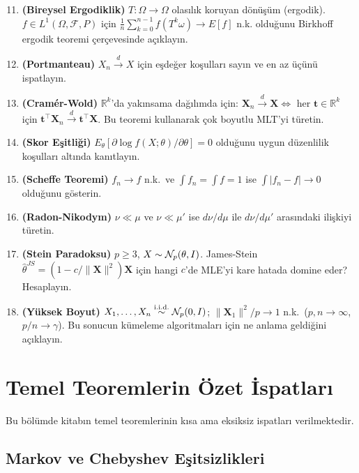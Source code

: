 \begin{enumerate}[label=\textbf{G.\arabic*.}]
\setcounter{enumi}{10}
  \item \textbf{(Bireysel Ergodiklik)} $T:\Omega\to\Omega$ olasılık koruyan dönüşüm (ergodik). $f\in L^1(\Omega,\mathcal{F},P)$ için $\frac{1}{n}\sum_{k=0}^{n-1}f(T^k\omega)\to E[f]$ n.k. olduğunu Birkhoff ergodik teoremi çerçevesinde açıklayın.
  \item \textbf{(Portmanteau)} $X_n\xrightarrow{d}X$ için eşdeğer koşulları sayın ve en az üçünü ispatlayın.
  \item \textbf{(Cramér-Wold)} $\mathbb{R}^k$'da yakınsama dağılımda için: $\mathbf{X}_n\xrightarrow{d}\mathbf{X}\iff$ her $\mathbf{t}\in\mathbb{R}^k$ için $\mathbf{t}^\top\mathbf{X}_n\xrightarrow{d}\mathbf{t}^\top\mathbf{X}$. Bu teoremi kullanarak çok boyutlu MLT'yi türetin.
  \item \textbf{(Skor Eşitliği)} $E_\theta[\partial\log f(X;\theta)/\partial\theta]=0$ olduğunu uygun düzenlilik koşulları altında kanıtlayın.
  \item \textbf{(Scheffe Teoremi)} $f_n\to f$ n.k.\ ve $\int f_n=\int f=1$ ise $\int|f_n-f|\to0$ olduğunu gösterin.
  \item \textbf{(Radon-Nikodym)} $\nu\ll\mu$ ve $\nu\ll\mu'$ ise $d\nu/d\mu$ ile $d\nu/d\mu'$ arasındaki ilişkiyi türetin.
  \item \textbf{(Stein Paradoksu)} $p\geq3$, $X\sim\mathcal{N}_p(\theta,I)$. James-Stein $\hat\theta^{JS}=(1-c/\|\mathbf{X}\|^2)\mathbf{X}$ için hangi $c$'de MLE'yi kare hatada domine eder? Hesaplayın.
  \item \textbf{(Yüksek Boyut)} $X_1,\ldots,X_n\overset{\text{i.i.d.}}{\sim}\mathcal{N}_p(0,I)$; $\|\mathbf{X}_1\|^2/p\to1$ n.k.\ ($p,n\to\infty$, $p/n\to\gamma$). Bu sonucun kümeleme algoritmaları için ne anlama geldiğini açıklayın.
\end{enumerate}

\section{Temel Teoremlerin Özet İspatları}
\label{app:ozet_ispatlar}

Bu bölümde kitabın temel teoremlerinin kısa ama eksiksiz ispatları verilmektedir.

\subsection{Markov ve Chebyshev Eşitsizlikleri}

